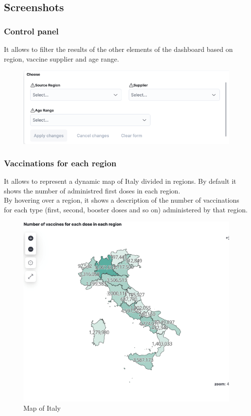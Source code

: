 \documentclass[12pt, a4paper]{article}
\begin{document}
\subsection{Screenshots}
\subsubsection{Control panel}
It allows to filter the results of the other elements of the dashboard based on region, vaccine supplier and age range.
\begin{figure}[ht]
  \centering
  \includegraphics[width=.9\linewidth]{img (2).png}
\end{figure}

\subsubsection{Vaccinations for each region}
It allows to represent a dynamic map of Italy divided in regions. By default it shows the
number of administred first doses in each region. \\ 
By hovering over a region, it shows a description of the number of vaccinations for each
type (first, second, booster doses and so on) administered by that region.

\begin{figure}[H]
  \centering
  \includegraphics[width=.8\linewidth]{img (4).png}
\caption*{Map of Italy}
\end{figure}
\end{document}
